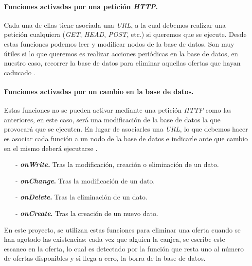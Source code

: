 \paragraph{Funciones activadas por una petición \textit{HTTP}.} Cada una de ellas tiene asociada una \textit{URL}, a la cual debemos realizar una petición cualquiera (\textit{GET}, \textit{HEAD}, \textit{POST}, etc.) si queremos que se ejecute. Desde estas funciones podemos leer y modificar nodos de la base de datos. Son muy útiles si lo que queremos es realizar acciones periódicas en la base de datos, en nuestro caso, recorrer la base de datos para eliminar aquellas ofertas que hayan caducado \cite{noauthor_http_nodate}.

\paragraph{Funciones activadas por un cambio en la base de datos.} Estas funciones no se pueden activar mediante una petición \textit{HTTP} como las anteriores, en este caso, será una modificación de la base de datos la que provocará que se ejecuten. En lugar de asociarles una \textit{URL}, lo que debemos hacer es asociar cada función a un nodo de la base de datos e indicarle ante que cambio en el mismo deberá ejecutarse \cite{noauthor_realtime_nodate}.

\begin{itemize}
\item[-] \textbf{\textit{onWrite}.} Tras la modificación, creación o eliminación de un dato.
\item[-]\textbf{\textit{onChange}.} Tras la modificación de un dato.
\item[-]\textbf{\textit{onDelete}.} Tras la eliminación de un dato.
\item[-]\textbf{\textit{onCreate}.} Tras la creación de un nuevo dato.
\end{itemize}

En este proyecto, se utilizan estas funciones para eliminar una oferta cuando se han agotado las existencias: cada vez que alguien la canjea, se escribe este escaneo en la oferta, lo cual es detectado por la función que resta uno al número de ofertas disponibles y si llega a cero, la borra de la base de datos.


